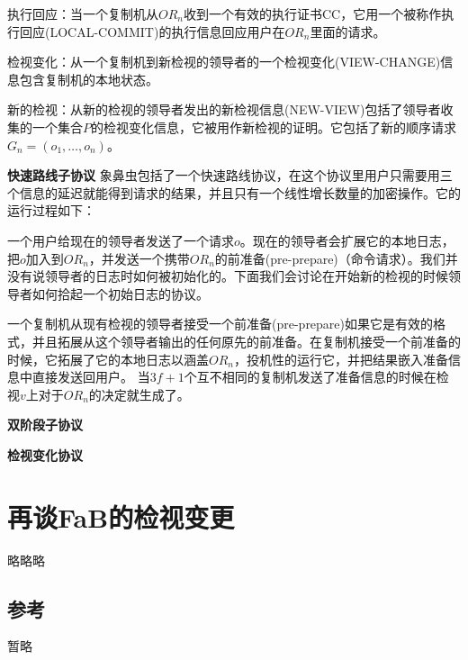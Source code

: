 \documentclass[UTF8]{ctexart}
\begin{document}
执行回应：当一个复制机从$OR_n$收到一个有效的执行证书CC，它用一个被称作执行回应(LOCAL-COMMIT)的执行信息回应用户在$OR_n$里面的请求。

检视变化：从一个复制机到新检视的领导者的一个检视变化(VIEW-CHANGE)信息包含复制机的本地状态。

新的检视：从新的检视的领导者发出的新检视信息(NEW-VIEW)包括了领导者收集的一个集合$P$的检视变化信息，它被用作新检视的证明。它包括了新的顺序请求$G_n = (o_1, \ldots, o_n)$。

\textbf{快速路线子协议} \hspace{3mm} 象鼻虫包括了一个快速路线协议，在这个协议里用户只需要用三个信息的延迟就能得到请求的结果，并且只有一个线性增长数量的加密操作。它的运行过程如下：

一个用户给现在的领导者发送了一个请求$o$。现在的领导者会扩展它的本地日志，把$o$加入到$OR_n$，并发送一个携带$OR_n$的前准备(pre-prepare)（命令请求）。我们并没有说领导者的日志时如何被初始化的。下面我们会讨论在开始新的检视的时候领导者如何拾起一个初始日志的协议。

一个复制机从现有检视的领导者接受一个前准备(pre-prepare)如果它是有效的格式，并且拓展从这个领导者输出的任何原先的前准备。在复制机接受一个前准备的时候，它拓展了它的本地日志以涵盖$OR_n$，投机性的运行它，并把结果嵌入准备信息中直接发送回用户。
当$3f + 1$个互不相同的复制机发送了准备信息的时候在检视$v$上对于$OR_n$的决定就生成了。


\textbf{双阶段子协议} \hspace{3mm}


\textbf{检视变化协议} \hspace{3mm}
\section{再谈FaB的检视变更}\label{sec:FaB}
略略略

\subsection*{参考}
暂略
\end{document}

